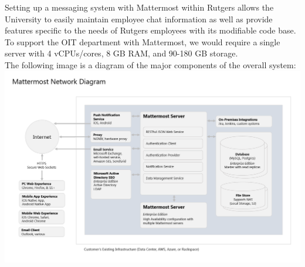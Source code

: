 \documentclass{scrreprt}
\begin{document}
Setting up a messaging system with Mattermost within Rutgers allows the
University to easily maintain employee chat information as well as provide
features specific to the needs of Rutgers employees with its modifiable code
base.\\

To support the OIT department with Mattermost, we would require a single server
with 4 vCPUs/cores, 8 GB RAM, and 90-180 GB storage.\\

The following image is a diagram of the major components of the overall system:
\includegraphics[scale=0.5, width=\textwidth]{mattermost-diagram.png}
\end{document}
